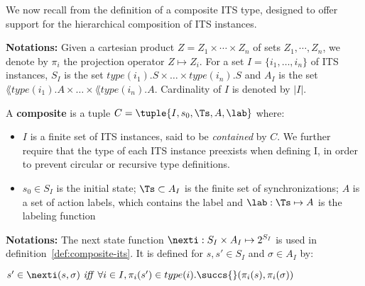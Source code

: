   We now recall from
\cite{tacas09tmphk} the definition of a composite ITS type, designed
to offer support for the hierarchical composition of ITS instances.

\textbf{Notations:} Given a cartesian product $Z=Z_1\times\cdots\times Z_n$ of
sets $Z_1,\cdots, Z_n$, we denote by $\pi_i$ the projection operator $Z
\mapsto Z_i$. For a set $I=\{i_1,\ldots,i_n\}$ of ITS instances, $S_I$ is the
set $type(i_1).S \times \ldots \times type(i_n).S$ and $A_I$ is the set
$\lang{type(i_1).A} \times \ldots \times \lang{type(i_n).A}$. Cardinality of
$I$ is denoted by $|I|$.

\begin{definition}[Composite]
\label{def:composite}
A \textbf{composite} is a tuple $C=\tuple{I, s_0, \Ts, A, \lab}$ where:
\begin{itemize}
\item $I$ is a finite set of ITS instances, said to be
  \emph{contained} by $C$. We further require that the type of each
  ITS instance preexists when defining I, in order to prevent circular
  or recursive type definitions.
\item $s_0 \in S_I$ is the initial state;
$\Ts \subset A_I$ is the finite set of synchronizations;
$A$ is a set of action labels, which contains the label \labloc{} and
$\lab : \Ts \mapsto A$ is the labeling function
\end{itemize}
\end{definition}


\textbf{Notations:} The next state function $\nexti : S_I \times A_I
\mapsto 2^{S_I}$ is used in definition~\ref{def:composite-its}. It is defined
for $s, s' \in S_I$ and $\sigma \in A_I$ by:

$s' \in \nexti(s,\sigma) \ \mathit{iff} \ \forall i \in I, \pi_i (s') \in
type(i).\succs{}(\pi_i(s), \pi_i (\sigma))$

